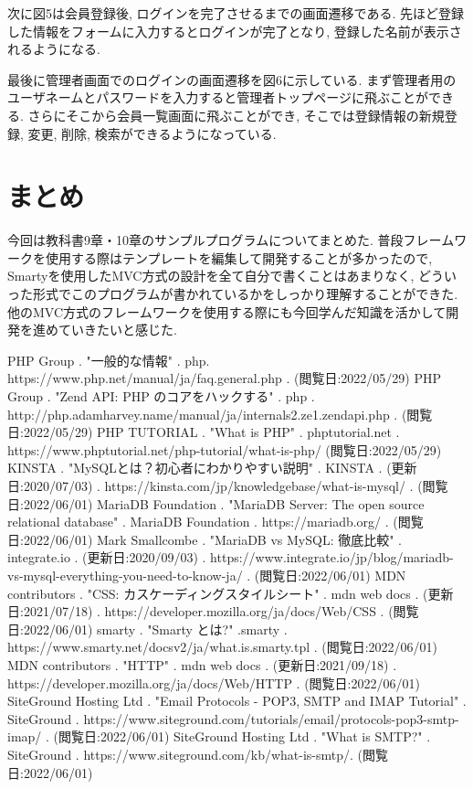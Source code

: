 \documentclass[submit,techrep]{ipsj}
\begin{document}
次に図5は会員登録後, ログインを完了させるまでの画面遷移である. 先ほど登録した情報をフォームに入力するとログインが完了となり, 登録した名前が表示されるようになる.


最後に管理者画面でのログインの画面遷移を図6に示している. まず管理者用のユーザネームとパスワードを入力すると管理者トップページに飛ぶことができる. さらにそこから会員一覧画面に飛ぶことができ, そこでは登録情報の新規登録, 変更, 削除, 検索ができるようになっている. 

\section{まとめ}
今回は教科書9章・10章のサンプルプログラムについてまとめた. 普段フレームワークを使用する際はテンプレートを編集して開発することが多かったので, Smartyを使用したMVC方式の設計を全て自分で書くことはあまりなく, どういった形式でこのプログラムが書かれているかをしっかり理解することができた. 
他のMVC方式のフレームワークを使用する際にも今回学んだ知識を活かして開発を進めていきたいと感じた. 



\begin{thebibliography}{9}
 PHP Group . "一般的な情報" . php. https://www.php.net/manual/ja/faq.general.php . (閲覧日:2022/05/29)
 PHP Group . "Zend API: PHP のコアをハックする" . php . http://php.adamharvey.name/manual/ja/internals2.ze1.zendapi.php . (閲覧日:2022/05/29)
 PHP TUTORIAL . "What is PHP" . phptutorial.net . https://www.phptutorial.net/php-tutorial/what-is-php/ (閲覧日:2022/05/29)
 KINSTA . "MySQLとは？初心者にわかりやすい説明" . KINSTA . (更新日:2020/07/03) . https://kinsta.com/jp/knowledgebase/what-is-mysql/ . (閲覧日:2022/06/01)
 MariaDB Foundation . "MariaDB Server: The open source relational database" . MariaDB Foundation . https://mariadb.org/ . (閲覧日:2022/06/01)
 Mark Smallcombe . "MariaDB vs MySQL: 徹底比較" . integrate.io . (更新日:2020/09/03) . https://www.integrate.io/jp/blog/mariadb-vs-mysql-everything-you-need-to-know-ja/ . (閲覧日:2022/06/01)
 MDN contributors . "CSS: カスケーディングスタイルシート" . mdn web docs . (更新日:2021/07/18) . https://developer.mozilla.org/ja/docs/Web/CSS . (閲覧日:2022/06/01)
 smarty . "Smarty とは?" .smarty . https://www.smarty.net/docsv2/ja/what.is.smarty.tpl . (閲覧日:2022/06/01)
 MDN contributors . "HTTP" . mdn web docs . (更新日:2021/09/18) . https://developer.mozilla.org/ja/docs/Web/HTTP . (閲覧日:2022/06/01)
 SiteGround Hosting Ltd . "Email Protocols - POP3, SMTP and IMAP Tutorial" . SiteGround . https://www.siteground.com/tutorials/email/protocols-pop3-smtp-imap/ . (閲覧日:2022/06/01)
 SiteGround Hosting Ltd . "What is SMTP?" . SiteGround . https://www.siteground.com/kb/what-is-smtp/. (閲覧日:2022/06/01)
\end{thebibliography}
\end{document}
